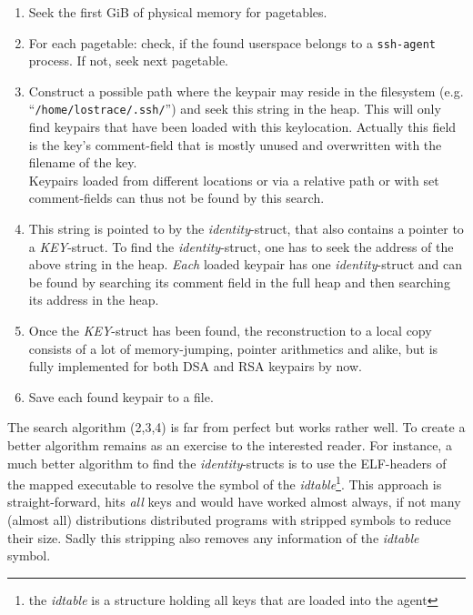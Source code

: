\begin{enumerate}

	\item Seek the first GiB of physical memory for pagetables.

	\item For each pagetable: check, if the found userspace belongs to a
	\texttt{ssh-agent} process. If not, seek next pagetable.

	\item Construct a possible path where the keypair may reside in the
	filesystem (e.g. ``\texttt{/home/lostrace/.ssh/}'') and seek this string
	in the heap. This will only find keypairs that have been loaded with
	this keylocation. Actually this field is the key's comment-field that is
	mostly unused and overwritten with the filename of the key. \\ Keypairs
	loaded from different locations or via a relative path or with set
	comment-fields can thus not be found by this search.
	
	\item This string is pointed to by the \emph{identity}-struct, that also
	contains a pointer to a \emph{KEY}-struct. To find the
	\emph{identity}-struct, one has to seek the address of the above string
	in the heap. \emph{Each} loaded keypair has one \emph{identity}-struct
	and can be found by searching its comment field in the full heap and
	then searching its address in the heap.
	
	\item Once the \emph{KEY}-struct has been found, the reconstruction to a
	local copy consists of a lot of memory-jumping, pointer arithmetics and
	alike, but is fully implemented for both DSA and RSA keypairs by now.

	\item Save each found keypair to a file.
	
\end{enumerate}
	
The search algorithm (2,3,4) is far from perfect but works rather well.  To
create a better algorithm remains as an exercise to the interested reader. For
instance, a much better algorithm to find the \emph{identity}-structs is to use
the ELF-headers of the mapped executable to resolve the symbol of the
\emph{idtable}\footnote{the \emph{idtable} is a structure holding all keys that
are loaded into the agent}. This approach is straight-forward, hits \emph{all}
keys and would have worked almost always, if not many (almost all) distributions
distributed programs with stripped symbols to reduce their size.  Sadly this
stripping also removes any information of the \emph{idtable} symbol.

